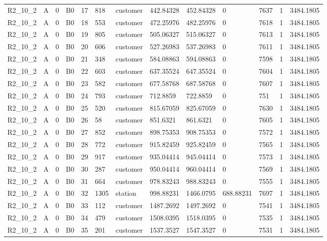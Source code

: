 \begin{longtable}{lllllllllllll}
R2\_10\_2 & A & 0 & B0 & 17 & 818 & customer & 442.84328 & 452.84328 & 0 & 7637 & 1 & 3484.1805 \\
R2\_10\_2 & A & 0 & B0 & 18 & 553 & customer & 472.25976 & 482.25976 & 0 & 7618 & 1 & 3484.1805 \\
R2\_10\_2 & A & 0 & B0 & 19 & 805 & customer & 505.06327 & 515.06327 & 0 & 7613 & 1 & 3484.1805 \\
R2\_10\_2 & A & 0 & B0 & 20 & 606 & customer & 527.26983 & 537.26983 & 0 & 7611 & 1 & 3484.1805 \\
R2\_10\_2 & A & 0 & B0 & 21 & 348 & customer & 584.08863 & 594.08863 & 0 & 7598 & 1 & 3484.1805 \\
R2\_10\_2 & A & 0 & B0 & 22 & 603 & customer & 637.35524 & 647.35524 & 0 & 7604 & 1 & 3484.1805 \\
R2\_10\_2 & A & 0 & B0 & 23 & 582 & customer & 677.58768 & 687.58768 & 0 & 7607 & 1 & 3484.1805 \\
R2\_10\_2 & A & 0 & B0 & 24 & 793 & customer & 712.8859 & 722.8859 & 0 & 751 & 1 & 3484.1805 \\
R2\_10\_2 & A & 0 & B0 & 25 & 520 & customer & 815.67059 & 825.67059 & 0 & 7630 & 1 & 3484.1805 \\
R2\_10\_2 & A & 0 & B0 & 26 & 58 & customer & 851.6321 & 861.6321 & 0 & 7605 & 1 & 3484.1805 \\
R2\_10\_2 & A & 0 & B0 & 27 & 852 & customer & 898.75353 & 908.75353 & 0 & 7572 & 1 & 3484.1805 \\
R2\_10\_2 & A & 0 & B0 & 28 & 772 & customer & 915.82459 & 925.82459 & 0 & 7565 & 1 & 3484.1805 \\
R2\_10\_2 & A & 0 & B0 & 29 & 917 & customer & 935.04414 & 945.04414 & 0 & 7573 & 1 & 3484.1805 \\
R2\_10\_2 & A & 0 & B0 & 30 & 287 & customer & 950.04414 & 960.04414 & 0 & 7569 & 1 & 3484.1805 \\
R2\_10\_2 & A & 0 & B0 & 31 & 664 & customer & 978.83243 & 988.83243 & 0 & 7555 & 1 & 3484.1805 \\
R2\_10\_2 & A & 0 & B0 & 32 & 1305 & station & 998.88231 & 1466.0795 & 688.88231 & 7697 & 1 & 3484.1805 \\
R2\_10\_2 & A & 0 & B0 & 33 & 112 & customer & 1487.2692 & 1497.2692 & 0 & 7541 & 1 & 3484.1805 \\
R2\_10\_2 & A & 0 & B0 & 34 & 479 & customer & 1508.0395 & 1518.0395 & 0 & 7535 & 1 & 3484.1805 \\
R2\_10\_2 & A & 0 & B0 & 35 & 201 & customer & 1537.3527 & 1547.3527 & 0 & 7531 & 1 & 3484.1805 \\

\end{longtable}
